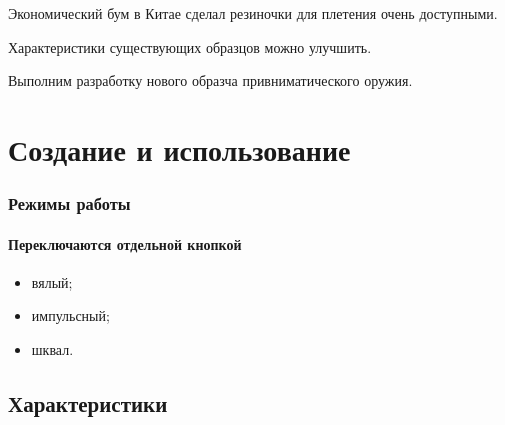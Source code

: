 Экономический бум в Китае сделал резиночки для плетения очень доступными.

\begin{frame}
    \begin{center}
        Характеристики существующих образцов можно улучшить. 
        
        \par\bigskip
        
        Выполним разработку нового образча привниматического оружия.
    \end{center}
\end{frame}


\section{Создание и использование}

\begin{frame}
    \frametitle{\myDevice}
\end{frame}

\begin{frame}
    \frametitle{Режимы работы \myDevice}
    \framesubtitle{Переключаются отдельной кнопкой}
    
    \begin{itemize}
        \item вялый;
        \item импульсный;
        \item шквал.
    \end{itemize}    
\end{frame}

\subsection{Характеристики}

